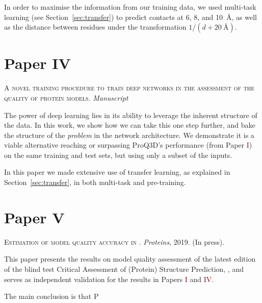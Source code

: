 In order to maximise the information from our training data, we used multi-task learning (see Section~\ref{sec:transfer}) to predict contacts at 6, 8, and \SI{10}{\angstrom}, as well as the distance between residues under the transformation $1/(d + \SI{20}{\angstrom})$.



\section*{Paper \textcolor[cmyk]{0, 0.87, 0.68, 0.32}{IV}}
\begin{center}
	\textsc{A novel training procedure to train deep networks in the assessment of the quality of protein models.}
	\emph{Manuscript}
\end{center}

\noindent
The power of deep learning lies in its ability to leverage the inherent structure of the data.
In this work, we show how we can take this one step further, and bake the structure of the \emph{problem} in the network architecture.
We demonstrate it is a viable alternative reaching or surpassing ProQ3D's performance (from Paper \textcolor{Maroon}{I}) on the same training and test sets, but using only a subset of the inputs.

In this paper we made extensive use of transfer learning, as explained in Section~\ref{sec:transfer}, in both multi-task and pre-training.

\section*{Paper \textcolor[cmyk]{0, 0.87, 0.68, 0.32}{V}}
\begin{center}
	\textsc{Estimation of model quality accuracy in .}
	\emph{Proteins}, 2019. (In press).
\end{center}

\noindent
This paper presents the results on model quality assessment of the latest edition of the blind test Critical Assessment of (Protein) Structure Prediction, ,
and serves as independent validation for the results in Papers \textcolor{Maroon}{I} and \textcolor{Maroon}{IV}.

The main conclusion is that P
